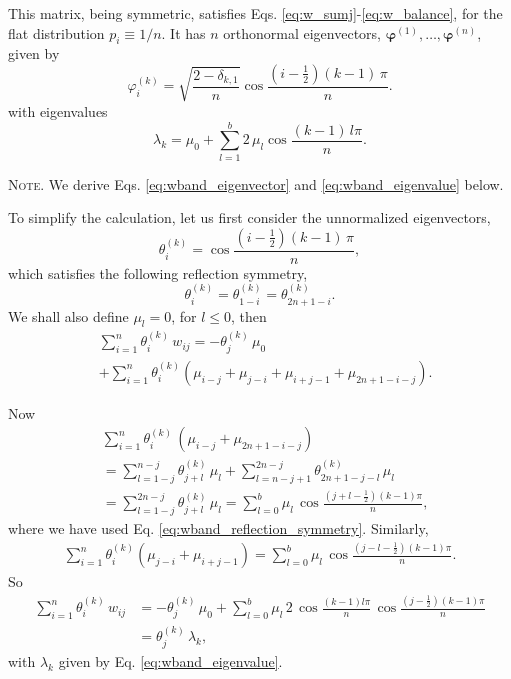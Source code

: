 \documentclass[reprint]{revtex4-1}
\newcommand{\note}[1]{{\color{DarkGreen}\footnotesize \textsc{Note.} #1}}
\begin{document}
This matrix, being symmetric,
satisfies Eqs. \eqref{eq:w_sumj}-\eqref{eq:w_balance},
for the flat distribution $p_i \equiv 1/n$.
%
It has $n$ orthonormal eigenvectors,
$\pmb\varphi^{(1)}, \dots, \pmb\varphi^{(n)}$,
given by
%
\begin{equation}
\varphi^{(k)}_i
= \sqrt{
    \frac{ 2 - \delta_{k, 1} }
         {       n           }
       }
  \cos \frac{ \left(i - \frac12\right) (k - 1) \, \pi}{n}.
\label{eq:wband_eigenvector}
\end{equation}
%
with eigenvalues
\begin{equation}
  \lambda_k = \mu_0 + \sum_{l = 1}^b 2 \, \mu_l \cos \frac{(k - 1)  \, l \pi}{n}.
\label{eq:wband_eigenvalue}
\end{equation}
%
\note{We derive Eqs.
  \eqref{eq:wband_eigenvector} and \eqref{eq:wband_eigenvalue}
  below.

  To simplify the calculation,
  let us first consider the unnormalized eigenvectors,
  $$
  \theta^{(k)}_i
  =
  \cos \frac{ \left(i - \frac12\right) (k - 1) \, \pi}{n},
  $$
  which satisfies the following reflection symmetry,
  \begin{equation}
    \theta^{(k)}_i = \theta^{(k)}_{1-i} = \theta^{(k)}_{2n+1-i}.
    \label{eq:wband_reflection_symmetry}
  \end{equation}
  We shall also define $\mu_l = 0$, for $l \le 0$, then
$$
\begin{aligned}
&\sum_{i = 1}^n
  \theta^{(k)}_i
  \, w_{ij}
=
- \theta^{(k)}_j \, \mu_0
\\
&
+\sum_{i=1}^n
  \theta^{(k)}_i
  \left(
    \mu_{i - j} + \mu_{j - i} + \mu_{i + j - 1} + \mu_{2n+1-i-j}
  \right)
.
\end{aligned}
$$

Now
$$
\begin{aligned}
  &
  \sum_{i=1}^n
  \theta^{(k)}_i \,
  \left(
    \mu_{i - j} + \mu_{2n+1-i-j}
  \right)
  \\
  &=
  \sum_{l=1-j}^{n-j} \theta^{(k)}_{j+l} \, \mu_l
  +
  \sum_{l=n-j+1}^{2n-j} \theta^{(k)}_{2n+1-j-l} \, \mu_l
  \\
  &=
  \sum_{l=1-j}^{2n-j} \theta^{(k)}_{j+l} \, \mu_l
  =
  \sum_{l=0}^{b} \mu_l \, \cos\frac{(j+l-\frac12)(k-1)\pi}{n},
\end{aligned}
$$
where we have used Eq. \eqref{eq:wband_reflection_symmetry}.
%
Similarly,
$$
\begin{aligned}
  \sum_{i=1}^n
  \theta^{(k)}_i
  \left(
    \mu_{j - i} + \mu_{i+j-1}
  \right)
  =
  \sum_{l=0}^{b} \mu_l \, \cos\frac{(j-l-\frac12)(k-1)\pi}{n}.
\end{aligned}
$$
%
So
$$
\begin{aligned}
\sum_{i = 1}^n \theta^{(k)}_i \, w_{ij}
&=
- \theta^{(k)}_j \, \mu_0
+\sum_{l=0}^{b} \mu_l \, 2 \, \cos\frac{(k-1)l\pi}{n} \, \cos\frac{(j-\frac12)(k-1)\pi}{n}
\\
&= \theta^{(k)}_j \, \lambda_k,
\end{aligned}
$$
with $\lambda_k$ given by Eq. \eqref{eq:wband_eigenvalue}.

}
\end{document}
